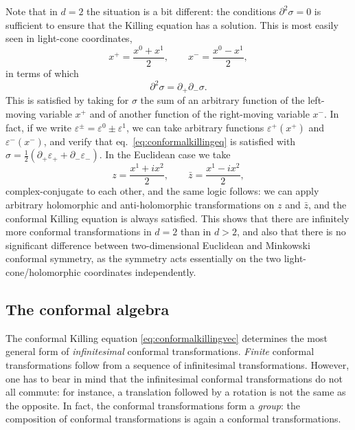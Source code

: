 \documentclass[a4paper,12pt]{article}
\numberwithin{equation}{section}
\begin{document}
Note that in $d = 2$ the situation is a bit different: the conditions $\partial^2 \sigma = 0$ is sufficient to ensure that the Killing equation has a solution. This is most easily seen in light-cone coordinates,
\begin{equation}
	x^+ = \frac{x^0 + x^1}{2},
	\qquad
	x^- = \frac{x^0 - x^1}{2},
\end{equation}
in terms of which
\begin{equation}
	\partial^2 \sigma = \partial_+ \partial_- \sigma.
\end{equation}
This is satisfied by taking for $\sigma$ the sum of an arbitrary function of the left-moving variable $x^+$ and of another function of the right-moving variable $x^-$. In fact, if we write $\varepsilon^\pm = \varepsilon^0 \pm \varepsilon^1$, we can 	take arbitrary functions $\varepsilon^+(x^+)$ and $\varepsilon^-(x^-)$, and verify that eq.~\eqref{eq:conformalkillingeq} is satisfied with $\sigma = \frac{1}{2} \left( \partial_+ \varepsilon_+ + \partial_- \varepsilon_- \right)$.
In the Euclidean case we take
\begin{equation}
	z = \frac{x^1 + i x^2}{2},
	\qquad
	\bar{z} = \frac{x^1 - i x^2}{2},
\end{equation}
complex-conjugate to each other, and the same logic follows: we can apply arbitrary holomorphic and anti-holomorphic transformations on $z$ and $\bar{z}$, and the conformal Killing equation is always satisfied. This shows that there are infinitely more conformal transformations in $d = 2$ than in $d > 2$, and also that there is no significant difference between two-dimensional Euclidean and Minkowski conformal symmetry, as the symmetry acts essentially on the two light-cone/holomorphic coordinates independently.


\subsection{The conformal algebra}

The conformal Killing equation \eqref{eq:conformalkillingvec} determines the most general form of \emph{infinitesimal} conformal transformations. \emph{Finite} conformal transformations follow from a sequence of infinitesimal transformations.
However, one has to bear in mind that the infinitesimal conformal transformations do not all commute: for instance, a translation followed by a rotation is not the same as the opposite.
In fact, the conformal transformations form a \emph{group}: the composition of conformal transformations is again a conformal transformations.
\end{document}
